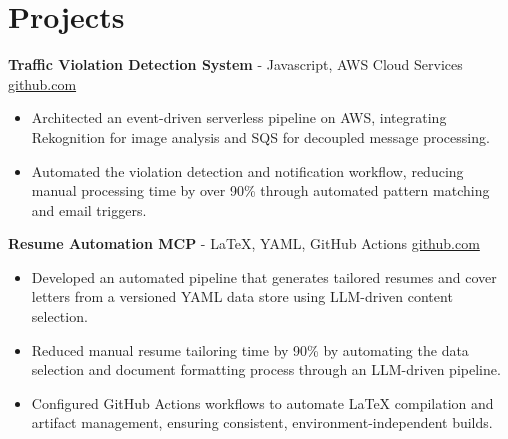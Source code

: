 \documentclass[11pt]{article}       %
\begin{document}

\vspace{-18.5pt}

\section*{Projects}

\textbf{Traffic Violation Detection System}{ - Javascript, AWS Cloud Services} \hfill \href{https://github.com/Monica20030707/AWS_rekonigition-N-read-database}{github.com} \\
\vspace{-9pt}
\begin{itemize}
  \item Architected an event-driven serverless pipeline on AWS, integrating Rekognition for image analysis and SQS for decoupled message processing.
  \item Automated the violation detection and notification workflow, reducing manual processing time by over 90\% through automated pattern matching and email triggers.
\end{itemize}

\textbf{Resume Automation MCP}{ - LaTeX, YAML, GitHub Actions} \hfill \href{https://github.com/Monica20030707/Tex_OrangeLeaf-mcp}{github.com} \\
\vspace{-9pt}
\begin{itemize}
  \item Developed an automated pipeline that generates tailored resumes and cover letters from a versioned YAML data store using LLM-driven content selection.
  \item Reduced manual resume tailoring time by 90\% by automating the data selection and document formatting process through an LLM-driven pipeline.
  \item Configured GitHub Actions workflows to automate LaTeX compilation and artifact management, ensuring consistent, environment-independent builds.
\end{itemize}
\end{document}
